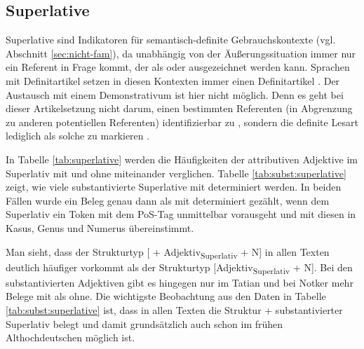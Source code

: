 \subsection{Superlative}\label{sec:ergeb-superaltiv}

Superlative sind Indikatoren für semantisch-definite Gebrauchskontexte  (vgl. Abschnitt \ref{sec:nicht-fam}), da unabhängig von der Äußerungssituation  immer nur ein Referent in Frage kommt, der als  oder  ausgezeichnet werden kann. Sprachen mit Definitartikel setzen in diesen Kontexten immer einen Definitartikel \parencite{Himmelmann2001}. Der Austausch mit einem Demonstrativum ist hier nicht möglich. Denn es geht bei dieser Artikelsetzung nicht darum, einen bestimmten Referenten (in Abgrenzung zu anderen potentiellen Referenten) identifizierbar zu , sondern die definite Lesart lediglich als solche zu markieren \parencite[41]{Himmelmann1997}.

In Tabelle \ref{tab:superlative} werden die Häufigkeiten der attributiven Adjektive im Superlativ mit und ohne  miteinander verglichen. Tabelle \ref{tab:subst:superlative} zeigt, wie viele substantivierte Superlative mit  determiniert werden. In beiden Fällen wurde ein Beleg genau dann als mit  determiniert gezählt, wenn dem Superlativ ein Token mit dem PoS-Tag  unmittelbar vorausgeht und mit diesen in Kasus, Genus und Numerus übereinstimmt. 

Man sieht, dass der Strukturtyp [ + Adjektiv\textsubscript{Superlativ} + N] in allen Texten deutlich häufiger vorkommt als der Strukturtyp [Adjektiv\textsubscript{Superlativ} + N]. Bei den substantivierten Adjektiven gibt es hingegen nur im Tatian und bei Notker mehr Belege mit  als ohne. Die wichtigste Beobachtung aus den Daten in Tabelle \ref{tab:subst:superlative} ist, dass in allen Texten die Struktur  + substantivierter Superlativ belegt und damit grundsätzlich auch schon im frühen Althochdeutschen möglich ist. 

 
